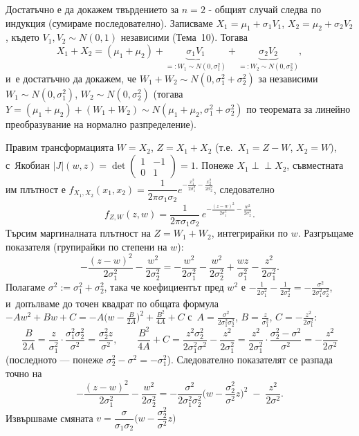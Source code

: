 \begin{proofbox}
Достатъчно е да докажем твърдението за $n=2$ - общият случай следва
по индукция (сумираме последователно). Записваме $X_1=\mu_1+
\sigma_1 V_1$, $X_2=\mu_2+\sigma_2V_2$, където $V_1,V_2\sim N(0,1)$
независими (Тема~10). Тогава
\[
  X_1+X_2 = (\mu_1+\mu_2) + \underbrace{\sigma_1V_1}_{=:W_1\sim N(0,\sigma_1^2)} + \underbrace{\sigma_2V_2}_{=:W_2\sim N(0,\sigma_2^2)},
\]
и~е достатъчно да докажем, че $W_1+W_2\sim N(0,\sigma_1^2+\sigma_2^2)$
за независими $W_1\sim N(0,\sigma_1^2)$, $W_2\sim N(0,\sigma_2^2)$
(тогава $Y=(\mu_1+\mu_2)+(W_1+W_2)\sim N(\mu_1+\mu_2,\sigma_1^2+
\sigma_2^2)$ по теоремата за линейно преобразувание на нормално
разпределение).

Правим трансформацията $W=X_2$, $Z=X_1+X_2$ (т.е.\ $X_1=Z-W$,
$X_2=W$), с~Якобиан $|J|(w,z)=\det\begin{pmatrix}1&-1\\0&1\end{pmatrix}=1$.
Понеже $X_1\perp\!\!\!\perp X_2$, съвместната им плътност е
$f_{X_1,X_2}(x_1,x_2)=\dfrac1{2\pi\sigma_1\sigma_2}e^{-\frac{x_1^2}{2\sigma_1^2}-\frac{x_2^2}{2\sigma_2^2}}$,
следователно
\[
  f_{Z,W}(z,w) = \frac1{2\pi\sigma_1\sigma_2}\,e^{-\frac{(z-w)^2}{2\sigma_1^2}-\frac{w^2}{2\sigma_2^2}}.
\]
Търсим маргиналната плътност на $Z=W_1+W_2$, интегрирайки по $w$.
Разгръщаме показателя (групирайки по степени на $w$):
\[
  -\frac{(z-w)^2}{2\sigma_1^2}-\frac{w^2}{2\sigma_2^2} = -\frac{w^2}{2\sigma_1^2}-\frac{w^2}{2\sigma_2^2}+\frac{wz}{\sigma_1^2}-\frac{z^2}{2\sigma_1^2}.
\]
Полагаме $\sigma^2:=\sigma_1^2+\sigma_2^2$, така че коефициентът пред
$w^2$ е $-\tfrac1{2\sigma_1^2}-\tfrac1{2\sigma_2^2}=-\tfrac{\sigma^2}
{2\sigma_1^2\sigma_2^2}$, и~допълваме до точен квадрат по общата
формула $-Aw^2+Bw+C=-A\big(w-\tfrac B{2A}\big)^2+\tfrac{B^2}{4A}+C$ с~$A=\tfrac{\sigma^2}{2\sigma_1^2\sigma_2^2}$, $B=\tfrac{z}{\sigma_1^2}$,
$C=-\tfrac{z^2}{2\sigma_1^2}$:
\[
  \frac B{2A} = \frac{z}{\sigma_1^2}\cdot\frac{\sigma_1^2\sigma_2^2}{\sigma^2} = \frac{\sigma_2^2z}{\sigma^2},
  \qquad
  \frac{B^2}{4A}+C = \frac{z^2\sigma_2^2}{2\sigma_1^2\sigma^2} - \frac{z^2}{2\sigma_1^2} = \frac{z^2}{2\sigma_1^2}\cdot\frac{\sigma_2^2-\sigma^2}{\sigma^2} = -\frac{z^2}{2\sigma^2}
\]
(последното — понеже $\sigma_2^2-\sigma^2=-\sigma_1^2$). Следователно
показателят се разпада точно на
\[
  -\frac{(z-w)^2}{2\sigma_1^2}-\frac{w^2}{2\sigma_2^2} = -\frac{\sigma^2}{2\sigma_1^2\sigma_2^2}\Big(w-\frac{\sigma_2^2}{\sigma^2}z\Big)^{\!2} \;-\; \frac{z^2}{2\sigma^2}.
\]
Извършваме смяната $v=\dfrac{\sigma}{\sigma_1\sigma_2}\Big(w-\dfrac{\sigma_2^2}{\sigma^2}z\Big)$

\end{proofbox}
